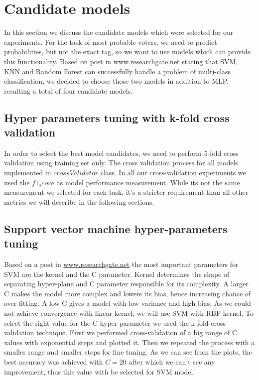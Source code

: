 \documentclass[12pt]{article}
\begin{document}
\section{Candidate models}
In this section we discuss the candidate models which were selected for our experiments. For the task of most probable voters, we need to predict probabilities, but not the exact tag, so we want to use models which can provide this functionality. Based on post in \href{https://www.researchgate.net/post/What_are_the_best_supervised_classifiers_to_classify_the_problem_of_multiclass_classification}{www.researchgate.net} stating that SVM, KNN and Random Forest can successfully handle a problem of multi-class classification, we decided to choose those two models in addition to MLP, resulting a total of four candidate models.

\subsection{Hyper parameters tuning with k-fold cross validation}
In order to select the best model candidates, we need to perform 5-fold cross validation using training set only. The cross validation process for all models implemented in $crossValidator$ class. In all our cross-validation experiments we used the $f1_score$ as model performance measurement. While its not the same measurement we selected for each task, it's a stricter requirement than all other metrics we will describe in the following sections.

\subsection{Support vector machine hyper-parameters tuning}
Based on a post in \href{https://www.researchgate.net/post/Is_it_necessary_to_choose_kernels_in_SVM_according_to_application}{www.researchgate.net} the most important parameters for SVM are the kernel and the C parameter. Kernel determines the shape of separating hyper-plane and C parameter responsible for its complexity. A larger C makes the model more complex and lowers its bias, hence increasing chance of over-fitting. A low C gives a model with low variance and high bias. As we could not achieve convergence with linear kernel, we will use SVM with RBF kernel. To select the right value for the C hyper parameter we used the k-fold cross validation technique. First we performed cross-validation of a big range of C values with exponential steps and plotted it. Then we repeated the process with a smaller range and smaller steps for fine tuning. As we can see from the plots, the best accuracy was achieved with $C=20$ after which we can't see any improvement, thus this value with be selected for SVM model.
\end{document}
